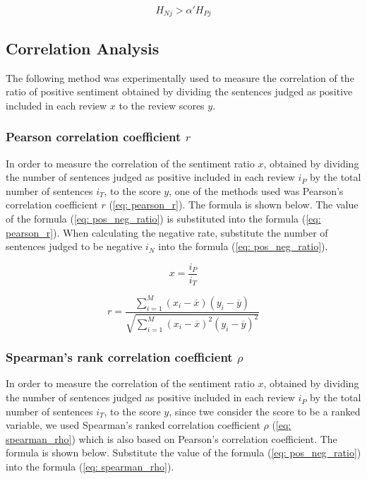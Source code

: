 \documentclass[review]{elsarticle}
\begin{document}
\begin{equation}\label{eq:entropy_neg}
H_{Nj} > \alpha' H_{Pj}
\end{equation}

\subsection{Correlation Analysis}\label{correlation}

The following method was experimentally used to measure the correlation of the ratio of positive sentiment obtained by dividing the sentences judged as positive included in each review \(x\) to the review scores \(y\).

\subsubsection{Pearson correlation coefficient \(r\)}\label{correl_pearson}

In order to measure the correlation of the sentiment ratio \(x\), obtained by dividing the number of sentences judged as positive included in each review \(i_P\) by the total number of sentences \(i_T\), to the score \(y\), one of the methods used was Pearson's correlation coefficient \(r\) (\ref{eq: pearson_r}). The formula is shown below. The value of the formula (\ref{eq: pos_neg_ratio}) is substituted into the formula (\ref{eq: pearson_r}). When calculating the negative rate, substitute the number of sentences judged to be negative \(i_N\) into the formula (\ref{eq: pos_neg_ratio}).

\begin{equation}\label{eq:pos_neg_ratio}
x = \frac{i_P}{i_T}
\end{equation}

\begin{equation}\label{eq:pearson_r}
r = \frac{{}\sum_{i=1}^{M} (x_i - \overline{x})(y_i - \overline{y})}
{\sqrt{\sum_{i=1}^{M} (x_i - \overline{x})^2(y_i - \overline{y})^2}}
\end{equation}

\subsubsection{Spearman's rank correlation coefficient \(\rho\)}\label{correl_spearman}

In order to measure the correlation of the sentiment ratio \(x\), obtained by dividing the number of sentences judged as positive included in each review \(i_P\) by the total number of sentences \(i_T\), to the score \(y\), since twe consider the score to be a ranked variable, we used Spearman's ranked correlation coefficient \(\rho\) (\ref{eq: spearman_rho}) which is also based on Pearson's correlation coefficient. The formula is shown below. Substitute the value of the formula (\ref{eq: pos_neg_ratio}) into the formula (\ref{eq: spearman_rho}).
\end{document}
